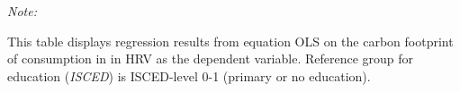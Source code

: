 \begin{table}[htbp!]
\begin{adjustbox}{width = 1\textwidth, max height = 0.95\textheight, center}
\begin{threeparttable}[b]
         \begin{tablenotes}\item \medskip \textit{Note:}
            \item This table displays regression results from equation OLS on the carbon footprint of consumption in  in HRV as the dependent variable.  Reference group for education (\textit{ISCED}) is ISCED-level 0-1 (primary or no education).
         \end{tablenotes}
      \end{threeparttable}
   \end{adjustbox}
\end{table}


